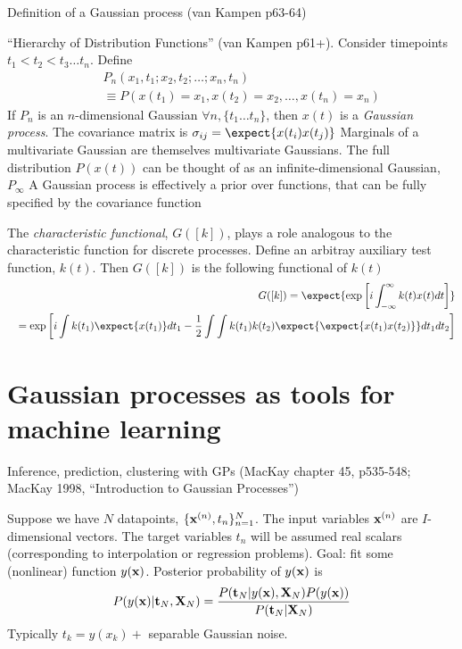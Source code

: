 \documentclass{beamer}
\begin{document}
\begin{frame}{}


 Definition of a Gaussian process (van Kampen p63-64)
 
  ``Hierarchy of Distribution Functions'' (van Kampen p61+). Consider timepoints $t_1 < t_2 < t_3 \ldots t_n$. Define
\begin{eqnarray*}
  & & P_n(x_1,t_1;x_2,t_2;\ldots;x_n,t_n) \\
  & & \equiv P(x(t_1) = x_1, x(t_2) = x_2, \ldots, x(t_n) = x_n)
\end{eqnarray*}
  If $P_n$ is an $n$-dimensional Gaussian $\forall n, \{ t_1 \ldots t_n \}$, then $x(t)$ is a {\em Gaussian process}. The covariance matrix is $\sigma_{ij} = \expect{x(t_i) x(t_j)}$
  Marginals of a multivariate Gaussian are themselves multivariate Gaussians.
The full distribution $P(x(t))$ can be thought of as an infinite-dimensional Gaussian, $P_\infty$
  A Gaussian process is effectively a prior over functions, that can be fully specified by the covariance function
 


\end{frame}

\begin{frame}{}

 The {\em characteristic functional}, $G([k])$, plays a role analogous to the characteristic function for discrete processes.
Define an arbitray auxiliary test function, $k(t)$. Then $G([k])$ is the following functional of $k(t)$
\begin{eqnarray*}
& & G([k]) = \expect{\exp \left[ i \int_{-\infty}^{\infty} k(t) x(t) dt \right]} \\
& & = \exp \left[ i\int k(t_1) \expect{x(t_1)} dt_1 - \frac{1}{2} \int \int k(t_1)k(t_2) \expect{\expect{x(t_1)x(t_2)}} dt_1 dt_2 \right]
\end{eqnarray*}

\end{frame}

\section{Gaussian processes as tools for machine learning}

\begin{frame}{}


 Inference, prediction, clustering with GPs (MacKay chapter 45, p535-548; MacKay 1998, ``Introduction to Gaussian Processes'')
 
  Suppose we have $N$ datapoints, $\{ {\bf x}^{(n)}, t_n \}_{n=1}^N$.
The input variables ${\bf x}^{(n)}$ are $I$-dimensional vectors.
The target variables $t_n$ will be assumed real scalars (corresponding to interpolation or regression problems).
  Goal: fit some (nonlinear) function $y({\bf x})$. Posterior probability of $y({\bf x})$ is
\[
P(y({\bf x})|{\bf t}_N,{\bf X}_N) = \frac{P({\bf t}_N|y({\bf x}),{\bf X}_N) P(y({\bf x}))}{P({\bf t}_N|{\bf X}_N)}
\]
Typically $t_k = y(x_k)+$ separable Gaussian noise.



\end{frame}
\end{document}

